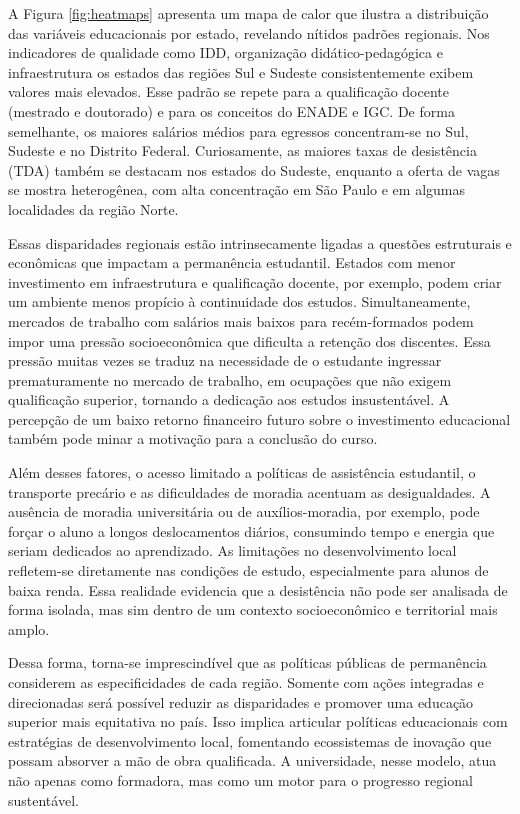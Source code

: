 A Figura \ref{fig:heatmaps} apresenta um mapa de calor que ilustra a distribuição das variáveis educacionais por estado, revelando nítidos padrões regionais. Nos indicadores de qualidade como IDD, organização didático-pedagógica e infraestrutura os estados das regiões Sul e Sudeste consistentemente exibem valores mais elevados. Esse padrão se repete para a qualificação docente (mestrado e doutorado) e para os conceitos do ENADE e IGC. De forma semelhante, os maiores salários médios para egressos concentram-se no Sul, Sudeste e no Distrito Federal. Curiosamente, as maiores taxas de desistência (TDA) também se destacam nos estados do Sudeste, enquanto a oferta de vagas se mostra heterogênea, com alta concentração em São Paulo e em algumas localidades da região Norte.

Essas disparidades regionais estão intrinsecamente ligadas a questões estruturais e econômicas que impactam a permanência estudantil. Estados com menor investimento em infraestrutura e qualificação docente, por exemplo, podem criar um ambiente menos propício à continuidade dos estudos. Simultaneamente, mercados de trabalho com salários mais baixos para recém-formados podem impor uma pressão socioeconômica que dificulta a retenção dos discentes. Essa pressão muitas vezes se traduz na necessidade de o estudante ingressar prematuramente no mercado de trabalho, em ocupações que não exigem qualificação superior, tornando a dedicação aos estudos insustentável. A percepção de um baixo retorno financeiro futuro sobre o investimento educacional também pode minar a motivação para a conclusão do curso.

Além desses fatores, o acesso limitado a políticas de assistência estudantil, o transporte precário e as dificuldades de moradia acentuam as desigualdades. A ausência de moradia universitária ou de auxílios-moradia, por exemplo, pode forçar o aluno a longos deslocamentos diários, consumindo tempo e energia que seriam dedicados ao aprendizado. As limitações no desenvolvimento local refletem-se diretamente nas condições de estudo, especialmente para alunos de baixa renda. Essa realidade evidencia que a desistência não pode ser analisada de forma isolada, mas sim dentro de um contexto socioeconômico e territorial mais amplo.

Dessa forma, torna-se imprescindível que as políticas públicas de permanência considerem as especificidades de cada região. Somente com ações integradas e direcionadas será possível reduzir as disparidades e promover uma educação superior mais equitativa no país. Isso implica articular políticas educacionais com estratégias de desenvolvimento local, fomentando ecossistemas de inovação que possam absorver a mão de obra qualificada. A universidade, nesse modelo, atua não apenas como formadora, mas como um motor para o progresso regional sustentável.

